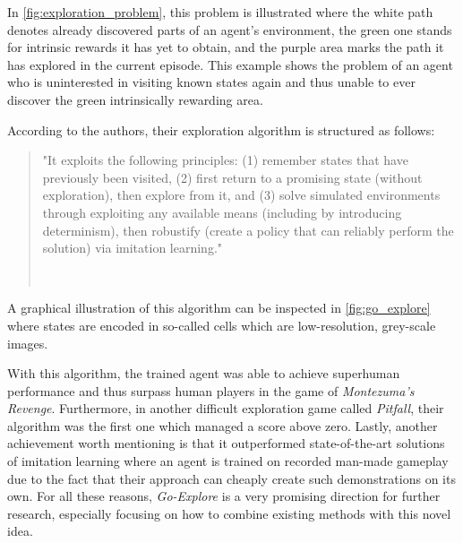 \documentclass[draft,final]{vutinfth} %
\newcommand{\p}[1]{see p. #1}
\begin{document}
    In \autoref{fig:exploration_problem}, this problem is illustrated where the white path denotes already discovered parts of an agent's environment, the green one stands for intrinsic rewards it has yet to obtain, and the purple area marks the path it has explored in the current episode.
    This example shows the problem of an agent who is uninterested in visiting known states again and thus unable to ever discover the green intrinsically rewarding area.

    According to the authors, their exploration algorithm is structured as follows:

    \newpage

    \begin{quote}
        "It exploits the following principles: (1) remember states that have
        previously been visited, (2) first return to a promising state (without exploration),
        then explore from it, and (3) solve simulated environments through exploiting any
        available means (including by introducing determinism), then robustify (create a
        policy that can reliably perform the solution) via imitation learning."

        \hfill~\cite[\p{1}]{ecoffet_go-explore_2019}
    \end{quote}

    A graphical illustration of this algorithm can be inspected in \autoref{fig:go_explore} where states are encoded in so-called cells which are low-resolution, grey-scale images.

    With this algorithm, the trained agent was able to achieve superhuman performance and thus surpass human players in the game of \textit{Montezuma's Revenge}.
    Furthermore, in another difficult exploration game called \textit{Pitfall}, their algorithm was the first one which managed a score above zero.
    Lastly, another achievement worth mentioning is that it outperformed state-of-the-art solutions of imitation learning where an agent is trained on recorded man-made gameplay due to the fact that their approach can cheaply create such demonstrations on its own.
    For all these reasons, \textit{Go-Explore} is a very promising direction for further research, especially focusing on how to combine existing methods with this novel idea.
\end{document}
